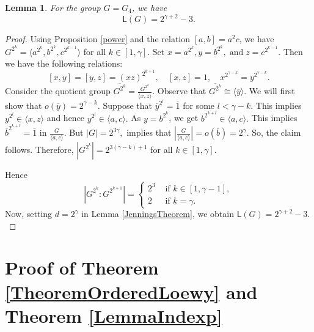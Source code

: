 \documentclass[a4paper,11pt]{article}
\numberwithin{equation}{section}
\newtheorem{lem}[thm]{Lemma}
\newcommand{\no}{\noindent}
\begin{document}
\begin{lem}\label{LemmaG_4} For the group $G=G_4$, we have
$$\mathsf{L}(G)= 2^{\gamma+2}-3.$$
\end{lem}

\begin{proof}
 Using Proposition \ref{power} and the relation  $[a,b]=a^{2} c$, we have $G^{2^k}=\langle a^{2^k}, b^{2^k}, c^{2^{k-1}} \rangle$ for all $k \in [1,\gamma].$ Set $x=a^{2^k}, y=b^{2^k},\;\text{and}\; z=c^{2^{k-1}}.$ Then we have the following relations:
\[[x,y]=[y,z]=(xz)^{2^{k+1}}, \quad [x,z]=1, \quad x^{2^{\gamma-k}}=y^{2^{\gamma-k}}.\]
\noindent Consider the quotient group $\overline{G^{2^k}}=\frac{G^{2^k}}{\langle x,z\rangle}.$  
 Observe that  $\overline{G^{2^k}}\cong \langle \overline{y} \rangle$. We will first show that $o(\overline{y})=2^{\gamma-k}$. Suppose that $\overline{y}^{2^l}=\overline{1}$ for some $l<\gamma-k.$ This implies $y^{2^l}\in \langle x,z\rangle$ and hence $y^{2^l}\in \langle a,c\rangle.$ As $y=b^{2^k}$, we get $b^{2^{k+l}} \in \langle a,c\rangle.$ This implies $\overline{b}^{2^{k+l}}=\overline{1}$ in $\frac{G}{\langle a,c\rangle}.$ But  $|G|=2^{3 \gamma},$ implies that $|\frac{G}{\langle a,c\rangle}|=o(\overline{b})=2^\gamma.$ So, the claim follows. Therefore, 
  $|G^{2^k}|=2^{3(\gamma-k)+1}$ for all $k \in [1, \gamma].$
 
\no Hence
$$|G^{2^k}:G^{2^{k+1}}|=
\begin{cases}
2^3 &\mbox { if } k\in [1, \gamma -1], \\
2 &\mbox { if } k=\gamma.
\end{cases}
$$
\noindent Now, setting $d=2^{\gamma}$ in Lemma \ref{JenningsTheorem}, we obtain $\mathsf{L}(G)= 2^{\gamma+2}-3.$ 
\end{proof}


\section{Proof of Theorem \ref{TheoremOrderedLoewy} and Theorem \ref{LemmaIndexp}}
\end{document}
